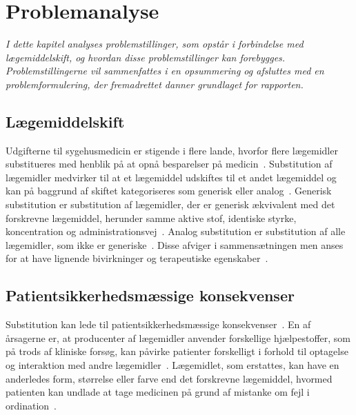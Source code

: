 \chapter{Problemanalyse}
\textit{I dette kapitel analyses problemstillinger, som opstår i forbindelse med lægemiddelskift, og hvordan disse problemstillinger kan forebygges. Problemstillingerne vil sammenfattes i en opsummering og afsluttes med en problemformulering, der fremadrettet danner grundlaget for rapporten.}

\section{Lægemiddelskift}
Udgifterne til sygehusmedicin er stigende i flere lande, hvorfor flere lægemidler substitueres med henblik på at opnå besparelser på medicin~\citep{Ess2003,Johnston2011}. Substitution af lægemidler medvirker til at et lægemiddel udskiftes til et andet lægemiddel og kan på baggrund af skiftet kategoriseres som generisk eller analog~\citep{DanskSelskabforPatientsikkerhed2009, Kairi2017}. Generisk substitution er substitution af lægemidler, der er  generisk ækvivalent med det forskrevne lægemiddel, herunder samme aktive stof, identiske styrke, koncentration og administrationsvej~\citep{DanskSelskabforPatientsikkerhed2009, Kairi2017}. %
Analog substitution er substitution af alle lægemidler, som ikke er generiske~\citep{Kairi2017}. Disse afviger i sammensætningen men anses for at have lignende bivirkninger og terapeutiske egenskaber~\citep{DanskSelskabforPatientsikkerhed2009, Kairi2017}.


\section{Patientsikkerhedsmæssige konsekvenser} \label{sec:ProblemLaeg} %
Substitution kan lede til patientsikkerhedsmæssige konsekvenser~\citep{DanskSelskabforPatientsikkerhed2009}. En af årsagerne er, at producenter af lægemidler anvender forskellige hjælpestoffer, som på trods af kliniske forsøg, kan påvirke patienter forskelligt i forhold til optagelse og interaktion med andre lægemidler~\citep{Kairi2017}. Lægemidlet, som erstattes, kan have en anderledes form, størrelse eller farve end det forskrevne lægemiddel, hvormed patienten kan undlade at tage medicinen på grund af mistanke om fejl i ordination~\citep{Kairi2017}. %

